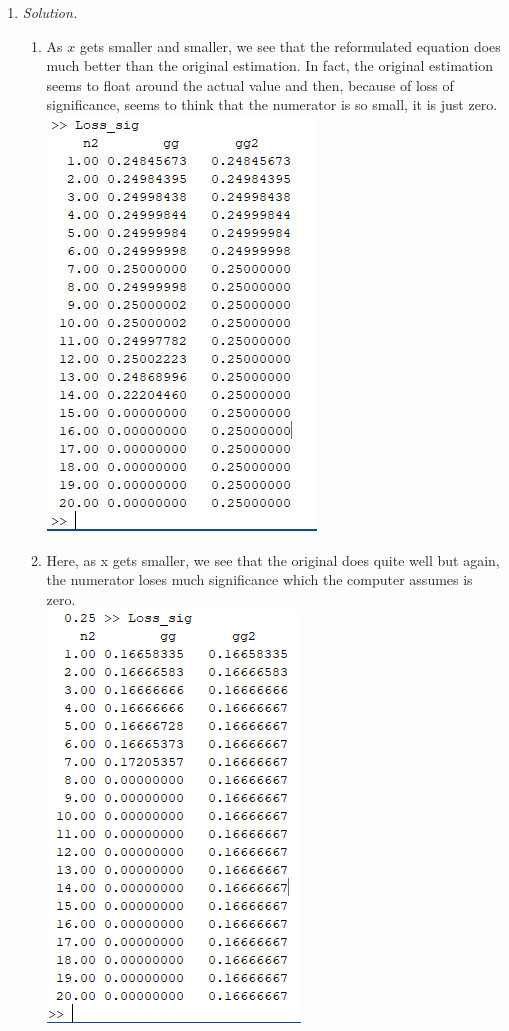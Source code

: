 \documentclass[12pt,letterpaper]{article}
\begin{document}
\begin{enumerate}
    \item \emph{Solution.}
    \begin{enumerate}
      \item As $x$ gets smaller and smaller, we see that the reformulated equation 
      does much better than the original estimation. In fact, the original estimation
      seems to float around the actual value and then, because of loss of significance, 
      seems to think that the numerator is so small, it is just zero. \\
      \includegraphics{loss_sig a.png}

      \item Here, as x gets smaller, we see that the original does quite well but again, 
      the numerator loses much significance which the computer assumes is zero. \\
      \includegraphics{loss_sig b.png}
    \end{enumerate}


\end{enumerate}
\end{document}
